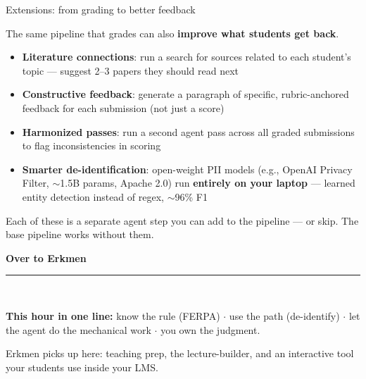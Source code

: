 \documentclass[aspectratio=169, 10pt]{beamer}
\begin{document}
\begin{frame}{Extensions: from grading to better feedback}
\vskip-2pt
\begin{tcolorbox}[accentbox, top=1pt, bottom=1pt]
\small The same pipeline that grades can also \textbf{improve what students get back}.
\end{tcolorbox}
\vskip3pt
\begin{itemize}\setlength{\itemsep}{3pt}
  \item \textbf{Literature connections}: run a search for sources related to each student's topic --- suggest 2--3 papers they should read next
  \item \textbf{Constructive feedback}: generate a paragraph of specific, rubric-anchored feedback for each submission (not just a score)
  \item \textbf{Harmonized passes}: run a second agent pass across all graded submissions to flag inconsistencies in scoring
  \item \textbf{Smarter de-identification}: open-weight PII models (e.g., OpenAI Privacy Filter, $\sim$1.5B params, Apache 2.0) run \textbf{entirely on your laptop} --- learned entity detection instead of regex, $\sim$96\% F1
\end{itemize}
\vskip4pt
\begin{tcolorbox}[quotebox, top=2pt, bottom=2pt]
\small Each of these is a separate agent step you can add to the pipeline --- or skip. The base pipeline works without them.
\end{tcolorbox}
\end{frame}


{
\begin{frame}
\centering\vfill
{\fontsize{20}{26}\bfseries\selectfont\color{white} Over to Erkmen}\\[8pt]
{\color{UVMGold}\rule{6cm}{0.8pt}}\\[8pt]
\begin{tcolorbox}[accentbox, width=11cm, top=4pt, bottom=4pt]
\centering\small
\textbf{This hour in one line:} know the rule (FERPA) $\cdot$ use the path (de-identify) $\cdot$ let the agent do the mechanical work $\cdot$ you own the judgment.
\end{tcolorbox}
\vskip10pt
{\normalsize\color{PaleSage} Erkmen picks up here: teaching prep, the lecture-builder, and an interactive tool your students use inside your LMS.}
\vfill
\end{frame}
}
\end{document}
